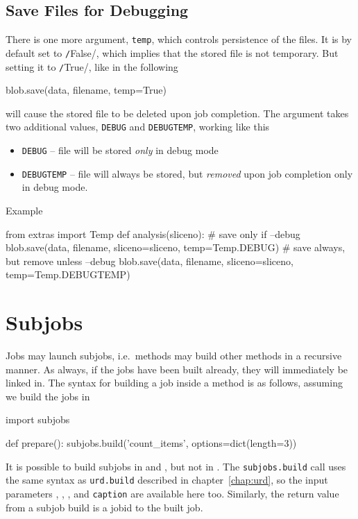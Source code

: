 \subsection*{Save Files for Debugging}
There is one more argument, \texttt{temp}, which controls persistence
of the files.  It is by default set to \texttt/False/,
which implies that the stored file is not temporary.  But setting it
to \texttt/True/, like in the following
\begin{python}
    blob.save(data, filename, temp=True)
\end{python}
will cause the stored file to be deleted upon job completion.  The
argument takes two additional values, \texttt{DEBUG} and
\texttt{DEBUGTEMP}, working like this
\begin{itemize}
\item[] \texttt{DEBUG} -- file will be stored \emph{only} in debug
  mode
\item[] \texttt{DEBUGTEMP} -- file will always be stored, but
  \emph{removed} upon job completion only in debug mode.
\end{itemize}
Example
\begin{python}
from extras import Temp
def analysis(sliceno):
  # save only if --debug
  blob.save(data, filename, sliceno=sliceno, temp=Temp.DEBUG)
  # save always, but remove unless --debug
  blob.save(data, filename, sliceno=sliceno, temp=Temp.DEBUGTEMP)
\end{python}


\section{Subjobs}

Jobs may launch subjobs, i.e.\ methods may build other methods in a
recursive manner.  As always, if the jobs have been built already,
they will immediately be linked in.  The syntax for building a job
inside a method is as follows, assuming we build the jobs in \prepare
\begin{python}
import subjobs

def prepare():
  subjobs.build('count_items', options=dict(length=3))
\end{python}
It is possible to build subjobs in \prepare and \synthesis, but not in
\analysis.    The \texttt{subjobs.build} call uses the
same syntax as \texttt{urd.build} described in chapter~\ref{chap:urd}, so
the input parameters \options, \datasets, \jobids, and
\texttt{caption} are available here too.  Similarly, the return value
from a subjob build is a jobid to the built job.

